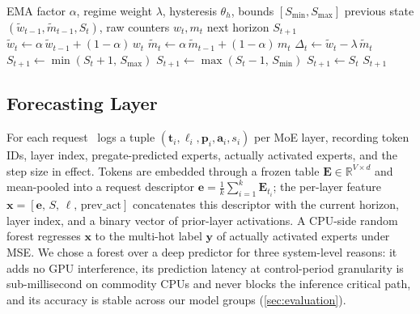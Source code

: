 \begin{algorithm}[t]
\caption{\systemname\ adaptive horizon controller (per control period~$T_u$).}
\label{alg:controller}
\begin{algorithmic}[1]
\Require EMA factor $\alpha$, regime weight $\lambda$, hysteresis $\theta_h$, bounds $[S_{\min}, S_{\max}]$
\Require previous state $(\tilde{w}_{t-1}, \tilde{m}_{t-1}, S_t)$, raw counters $w_t, m_t$
\Ensure next horizon $S_{t+1}$
\State $\tilde{w}_t \gets \alpha\,\tilde{w}_{t-1} + (1-\alpha)\,w_t$ 
\State $\tilde{m}_t \gets \alpha\,\tilde{m}_{t-1} + (1-\alpha)\,m_t$ 
\State $\Delta_t \gets \tilde{w}_t - \lambda\,\tilde{m}_t$         
                                         
    \State $S_{t+1} \gets \min(S_t + 1,\, S_{\max})$
                                     
    \State $S_{t+1} \gets \max(S_t - 1,\, S_{\min})$
\Else                                                              
    \State $S_{t+1} \gets S_t$
\EndIf
\State \Return $S_{t+1}$
\end{algorithmic}
\end{algorithm}

\subsection{Forecasting Layer}
\label{sec:design:forecaster}

For each request \systemname\ logs a tuple
$(\mathbf{t}_i, \ell_i, \mathbf{p}_i, \mathbf{a}_i, s_i)$ per MoE
layer, recording token IDs, layer index, pregate-predicted experts,
actually activated experts, and the step size in effect. Tokens are
embedded through a frozen table $\mathbf{E}\in\mathbb{R}^{V\times d}$
and mean-pooled into a request descriptor
$\mathbf{e}=\tfrac{1}{k}\sum_{i=1}^k \mathbf{E}_{t_i}$; the per-layer
feature $\mathbf{x} = [\mathbf{e},\, S,\, \ell,\, \text{prev\_act}]$
concatenates this descriptor with the current horizon, layer index,
and a binary vector of prior-layer activations. A CPU-side random
forest regresses $\mathbf{x}$ to the multi-hot label $\mathbf{y}$ of
actually activated experts under MSE. We chose a forest over a deep
predictor for three system-level reasons: it adds no GPU interference,
its prediction latency at control-period granularity is sub-millisecond
on commodity CPUs and never blocks the inference critical path, and
its accuracy is stable across our model groups
(\autoref{sec:evaluation}).

